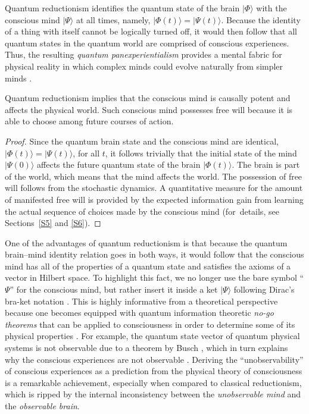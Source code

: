 \documentclass{ws-ijmpb}
\begin{document}
Quantum reductionism identifies the quantum state of the brain $\vert \Phi\rangle$
with the conscious mind $\vert \Psi\rangle$ at all times, namely, $\vert \Phi(t)\rangle=\vert \Psi(t)\rangle$.
Because the identity of a thing with itself
cannot be logically turned off, it would then follow that all quantum
states in the quantum world are comprised of conscious experiences.
Thus, the resulting \emph{quantum panexperientialism} provides a mental fabric
for physical reality in which complex minds could evolve naturally
from simpler minds \cite{Georgiev2017}.

\begin{theorem}
\label{thm:4}
Quantum reductionism implies that the conscious mind
is causally potent and affects the physical world. Such conscious
mind possesses free will because it is able to choose among future courses of action.
\end{theorem}
\begin{proof}
Since the quantum brain state and the conscious mind are identical,
$\vert \Phi(t)\rangle=\vert \Psi(t)\rangle$, for all $t$, it follows
trivially that the initial state of the mind $\vert \Psi(0)\rangle$ affects
the future quantum state of the brain $\vert \Phi(t)\rangle$. The brain
is part of the world, which means that the mind affects the world.
The possession of free will follows from the stochastic dynamics.
A quantitative measure for the amount of manifested free will is provided
by the expected information gain from learning the actual sequence
of choices made by the conscious mind (for~details, see Sections~\ref{S5} and \ref{S6}).
\end{proof}

One of the advantages of quantum reductionism is that because the
quantum brain--mind identity relation goes in both ways, it would
follow that the conscious mind has all of the properties of a quantum
state and satisfies the axioms of a vector in Hilbert space. To highlight
this fact, we no longer use the bare symbol ``$\Psi$'' for
the conscious mind, but rather insert it inside a ket $\vert \Psi\rangle$
following Dirac's bra-ket notation \cite{Dirac1939,Dirac1967}. This is highly
informative from a theoretical perspective because one becomes equipped
with quantum information theoretic \emph{no-go theorems} that can
be applied to consciousness in order to determine some of its physical properties \cite{Georgiev2017,Melkikh2019}.
For example, the quantum state vector of quantum physical systems is not observable due to a theorem by Busch \cite{Busch1997}, which in turn explains why the conscious
experiences are not observable \cite{Georgiev2017,Georgiev2020a,Georgiev2020b}.
Deriving the ``unobservability'' of conscious experiences
as a prediction from the physical theory of consciousness is a remarkable
achievement, especially when compared to classical reductionism, which
is ripped by the internal inconsistency between the \emph{unobservable mind}
and the \emph{observable brain}.
\end{document}

